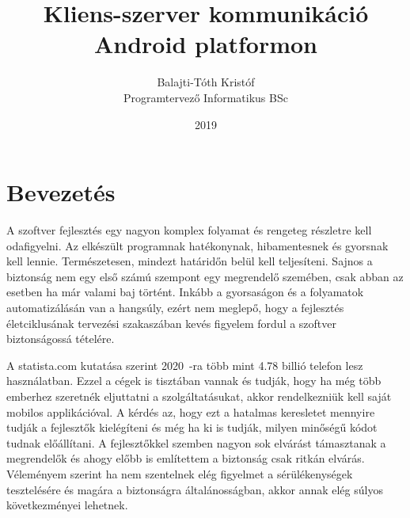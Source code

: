\documentclass{thesis-ekf}
\theoremstyle{definition}
\theoremstyle{remark}
\begin{document}
\title{Kliens-szerver kommunikáció\\Android platformon}
\author{Balajti-Tóth Kristóf\\Programtervező Informatikus BSc}
\date{2019}
\maketitle
\tableofcontents
\listoffigures
\def\lstlistlistingname{Forráskódok jegyzéke}
\lstlistoflistings

\chapter*{Bevezetés}

A szoftver fejlesztés egy nagyon komplex folyamat és rengeteg részletre kell odafigyelni.
Az elkészült programnak hatékonynak, hibamentesnek és gyorsnak kell lennie. Természetesen, mindezt határidőn belül kell teljesíteni.
Sajnos a biztonság nem egy első számú szempont egy megrendelő szemében, csak abban az esetben ha már valami baj történt.
Inkább a gyorsaságon és a folyamatok automatizálásán van a hangsúly, ezért nem  meglepő, hogy a fejlesztés életciklusának tervezési szakaszában kevés figyelem fordul a szoftver biztonságossá tételére.

A statista.com \cite{statista} kutatása szerint 2020~-ra több mint 4.78 billió telefon lesz használatban.
Ezzel a cégek is tisztában vannak és tudják, hogy ha még több emberhez szeretnék eljuttatni a szolgáltatásukat, akkor rendelkezniük kell saját mobilos applikációval.
A kérdés az, hogy ezt a hatalmas keresletet mennyire tudják a fejlesztők kielégíteni és még ha ki is tudják, milyen minőségű kódot tudnak előállítani.
A fejlesztőkkel szemben nagyon sok elvárást támasztanak a megrendelők és ahogy előbb is említettem a biztonság csak ritkán elvárás.
Véleményem szerint ha nem szentelnek elég figyelmet a sérülékenységek tesztelésére és magára a biztonságra általánosságban, akkor annak elég súlyos következményei lehetnek.
\end{document}
